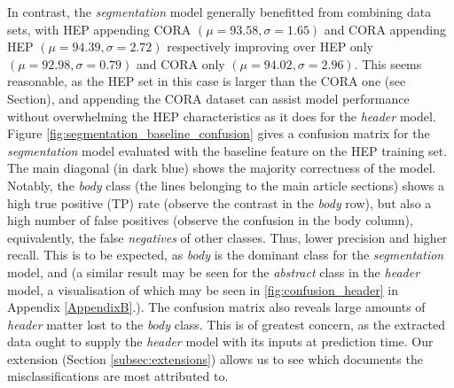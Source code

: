 In contrast, the \emph{segmentation} model generally benefitted from combining data sets, with HEP appending CORA $(\mu = 93.58, \sigma = 1.65)$ and CORA appending HEP $(\mu = 94.39, \sigma = 2.72)$ respectively improving over HEP only $(\mu = 92.98, \sigma = 0.79)$ and CORA only $(\mu = 94.02, \sigma = 2.96)$. This seems reasonable, as the HEP set in this case is larger than the CORA one (see Section), and appending the CORA dataset can assist model performance without overwhelming the HEP characteristics as it does for the \emph{header} model. Figure \ref{fig:segmentation_baseline_confusion} gives a confusion matrix for the \emph{segmentation} model evaluated with the baseline feature on the HEP training set. The main diagonal (in dark blue) shows the majority correctness of the model. Notably, the \emph{body} class (the lines belonging to the main article sections) shows a high true positive (TP) rate (observe the contrast in the \emph{body} row), but also a high number of false positives (observe the confusion in the body column), equivalently, the false \emph{negatives} of other classes. Thus, lower precision and higher recall. This is to be expected, as \emph{body} is the dominant class for the \emph{segmentation} model, and (a similar result may be seen for the \emph{abstract} class in the \emph{header} model, a visualisation of which may be seen in \ref{fig:confusion_header} in Appendix \ref{AppendixB}.). The confusion matrix also reveals large amounts of \emph{header} matter lost to the \emph{body} class. This is of greatest concern, as the extracted data ought to supply the \emph{header} model with its inputs at prediction time. Our extension (Section \ref{subsec:extensions}) allows us to see which documents the misclassifications are most attributed to.


